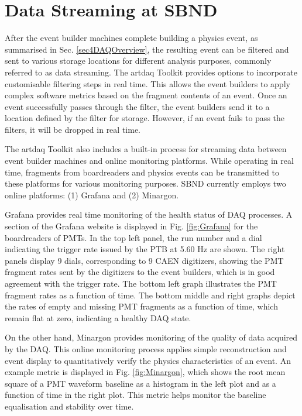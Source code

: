 \chapter{Data Streaming at SBND} 
\label{appendix_data_stream}
\ifpdf
    \graphicspath{{Appendix2/Figs/Raster/}{Appendix2/Figs/PDF/}{Appendix2/Figs/}}
\else
    \graphicspath{{Appendix2/Figs/Vector/}{Appendix2/Figs/}}
\fi

After the event builder machines complete building a physics event, as summarised in Sec. \ref{sec4DAQOverview}, the resulting event can be filtered and sent to various storage locations for different analysis purposes, commonly referred to as data streaming.
The artdaq Toolkit provides options to incorporate customisable filtering steps in real time. 
This allows the event builders to apply complex software metrics based on the fragment contents of an event. 
Once an event successfully passes through the filter, the event builders send it to a location defined by the filter for storage. 
However, if an event fails to pass the filters, it will be dropped in real time.

The artdaq Toolkit also includes a built-in process for streaming data between event builder machines and online monitoring platforms.
While operating in real time, fragments from boardreaders and physics events can be transmitted to these platforms for various monitoring purposes. 
SBND currently employs two online platforms: (1) Grafana and (2) Minargon.

Grafana provides real time monitoring of the health status of DAQ processes. 
A section of the Grafana website is displayed in Fig. \ref{fig:Grafana} for the boardreaders of PMTs.
In the top left panel, the run number and a dial indicating the trigger rate issued by the PTB at 5.60 Hz are shown. 
The right panels display 9 dials, corresponding to 9 CAEN digitizers, showing the PMT fragment rates sent by the digitizers to the event builders, which is in good agreement with the trigger rate.
The bottom left graph illustrates the PMT fragment rates as a function of time. 
The bottom middle and right graphs depict the rates of empty and missing PMT fragments as a function of time, which remain flat at zero, indicating a healthy DAQ state.

On the other hand, Minargon provides monitoring of the quality of data acquired by the DAQ. 
This online monitoring process applies simple reconstruction and event display to quantitatively verify the physics characteristics of an event. 
An example metric is displayed in Fig. \ref{fig:Minargon}, which shows the root mean square of a PMT waveform baseline as a histogram in the left plot and as a function of time in the right plot.
This metric helps monitor the baseline equalisation and stability over time.

